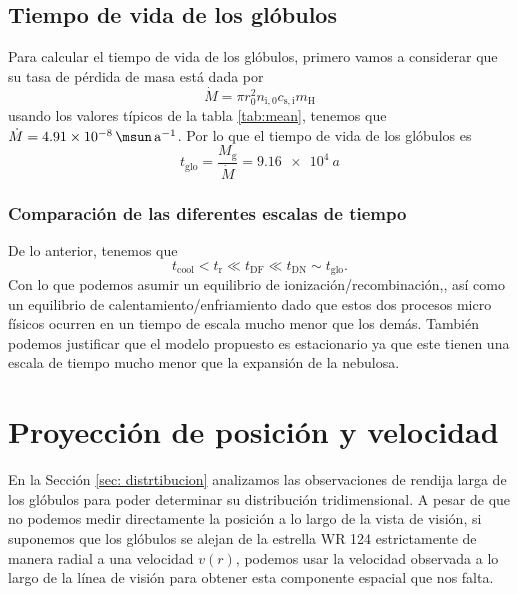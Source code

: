 \documentclass{book}
\begin{document}
\section{Tiempo de vida de los glóbulos}

Para calcular el tiempo de vida de los glóbulos, primero vamos a
considerar que su tasa de pérdida de masa está dada por
\begin{equation}
    \dot{M} =\pi r_0^2n_\mathrm{i,0}c_\mathrm{s,i}m_\mathrm{H}
\end{equation}
usando los valores típicos de la tabla \ref{tab:mean}, tenemos que
$\dot{M} = \SI{4.91e-8}{\msun.a^{-1}}$. Por lo que el tiempo de vida
de los glóbulos es
\begin{equation}
    t_\mathrm{glo}=\frac{M_\mathrm{g}}{\dot{M}}=\SI{9.16e4}{a}
\end{equation}

\subsection{Comparación de las diferentes escalas de tiempo}

De lo anterior, tenemos que
\begin{equation}
    t_ \mathrm{cool} < t_\mathrm{r} \ll t_\mathrm{DF}  \ll t_\mathrm{DN} \sim t_\mathrm{glo}.
\end{equation}
Con lo que podemos asumir un equilibrio de ionización/recombinación,,
así como un equilibrio de calentamiento/enfriamiento dado que estos
dos procesos micro físicos ocurren en un tiempo de escala mucho menor
que los demás. También podemos justificar que el modelo propuesto es
estacionario ya que este tienen una escala de tiempo mucho menor que
la expansión de la nebulosa.

\chapter{Proyección de posición y velocidad}\label{AP : PV}

En la Sección \ref{sec: distrtibucion} analizamos las observaciones de
rendija larga de los glóbulos para poder determinar su distribución
tridimensional. A pesar de que no podemos medir directamente la
posición a lo largo de la vista de visión, si suponemos que los
glóbulos se alejan de la estrella WR 124 estrictamente de manera
radial a una velocidad $v(r)$, podemos usar la velocidad observada a
lo largo de la línea de visión para obtener esta componente espacial
que nos falta.
\end{document}
